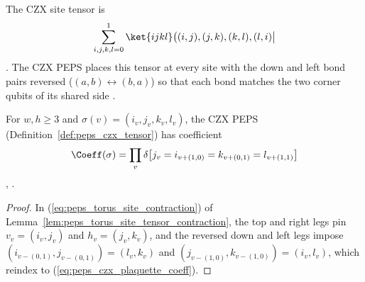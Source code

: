 \begin{definition}%
    \label{def:peps_czx_tensor}
    \leanok
    The CZX site tensor is
    \begin{align}
        \sum_{i,j,k,l=0}^{1}\ket{ijkl}\bigl((i,j),(j,k),(k,l),(l,i)\bigr|
        \notag
    \end{align}
    \cite[Appendix~A, ``The CZX model'']{Cirac2021Matrix}. The CZX PEPS places
    this tensor at every site with the down and left bond pairs reversed
    ($(a,b)\leftrightarrow(b,a)$) so that each bond matches the two corner
    qubits of its shared side \cite{gap:rmp_peps_czx_bond_orientation}.
\end{definition}

\begin{lemma}%
    \label{thm:peps_czx_plaquette_product}
    \leanok
    For $w,h\ge 3$ and $\sigma(v)=(i_v,j_v,k_v,l_v)$, the CZX PEPS
    (Definition~\ref{def:peps_czx_tensor}) has coefficient
    \begin{align}
        \Coeff(\sigma)=\prod_{v}\delta\bigl[j_v=i_{v+(1,0)}=k_{v+(0,1)}
            =l_{v+(1,1)}\bigr]
        \label{eq:peps_czx_plaquette_coeff}
    \end{align}
    \cite[Appendix~A, ``The CZX model'']{Cirac2021Matrix},
    \cite{ChenLiuWen2011CZX}.
\end{lemma}

\begin{proof}\leanok
    In (\ref{eq:peps_torus_site_contraction}) of
    Lemma~\ref{lem:peps_torus_site_tensor_contraction}, the top and right legs
    pin $v_v=(i_v,j_v)$ and $h_v=(j_v,k_v)$, and the reversed down and left legs
    impose $(i_{v-(0,1)},j_{v-(0,1)})=(l_v,k_v)$ and
    $(j_{v-(1,0)},k_{v-(1,0)})=(i_v,l_v)$, which reindex to
    (\ref{eq:peps_czx_plaquette_coeff}).
\end{proof}

